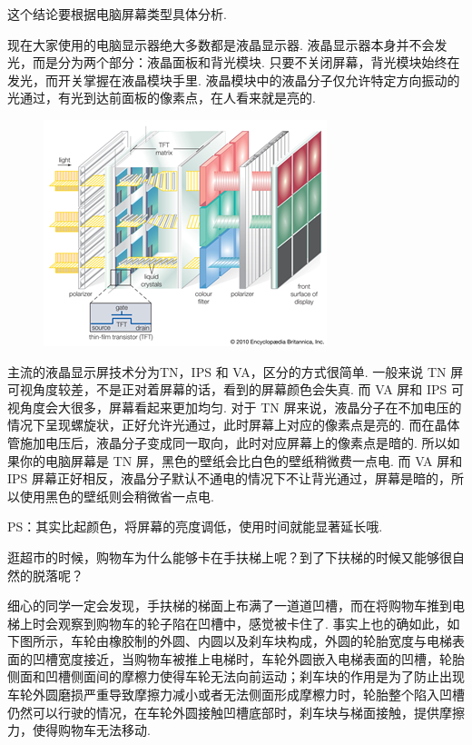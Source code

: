 \ADhairui\newpage
{}
\begin{multicols}{2}
\noindent{}

这个结论要根据电脑屏幕类型具体分析. 

现在大家使用的电脑显示器绝大多数都是液晶显示器. 液晶显示器本身并不会发光，而是分为两个部分：液晶面板和背光模块. 只要不关闭屏幕，背光模块始终在发光，而开关掌握在液晶模块手里. 液晶模块中的液晶分子仅允许特定方向振动的光通过，有光到达前面板的像素点，在人看来就是亮的. 
\begin{figure}[H]
\centering
\includegraphics[width=0.7\linewidth]{IMG/201911/image1.png}
\end{figure}

主流的液晶显示屏技术分为TN，IPS 和 VA，区分的方式很简单. 一般来说 TN 屏可视角度较差，不是正对着屏幕的话，看到的屏幕颜色会失真. 而 VA 屏和 IPS 可视角度会大很多，屏幕看起来更加均匀. 对于 TN 屏来说，液晶分子在不加电压的情况下呈现螺旋状，正好允许光通过，此时屏幕上对应的像素点是亮的. 而在晶体管施加电压后，液晶分子变成同一取向，此时对应屏幕上的像素点是暗的. 所以如果你的电脑屏幕是 TN 屏，黑色的壁纸会比白色的壁纸稍微费一点电. 而 VA 屏和 IPS 屏幕正好相反，液晶分子默认不通电的情况下不让背光通过，屏幕是暗的，所以使用黑色的壁纸则会稍微省一点电. 

PS：其实比起颜色，将屏幕的亮度调低，使用时间就能显著延长哦. 

\noindent{}

逛超市的时候，购物车为什么能够卡在手扶梯上呢？到了下扶梯的时候又能够很自然的脱落呢？

细心的同学一定会发现，手扶梯的梯面上布满了一道道凹槽，而在将购物车推到电梯上时会观察到购物车的轮子陷在凹槽中，感觉被卡住了. 事实上也的确如此，如下图所示，车轮由橡胶制的外圆、内圆以及刹车块构成，外圆的轮胎宽度与电梯表面的凹槽宽度接近，当购物车被推上电梯时，车轮外圆嵌入电梯表面的凹槽，轮胎侧面和凹槽侧面间的摩檫力使得车轮无法向前运动；刹车块的作用是为了防止出现车轮外圆磨损严重导致摩擦力减小或者无法侧面形成摩檫力时，轮胎整个陷入凹槽仍然可以行驶的情况，在车轮外圆接触凹槽底部时，刹车块与梯面接触，提供摩擦力，使得购物车无法移动. 


\end{multicols}
